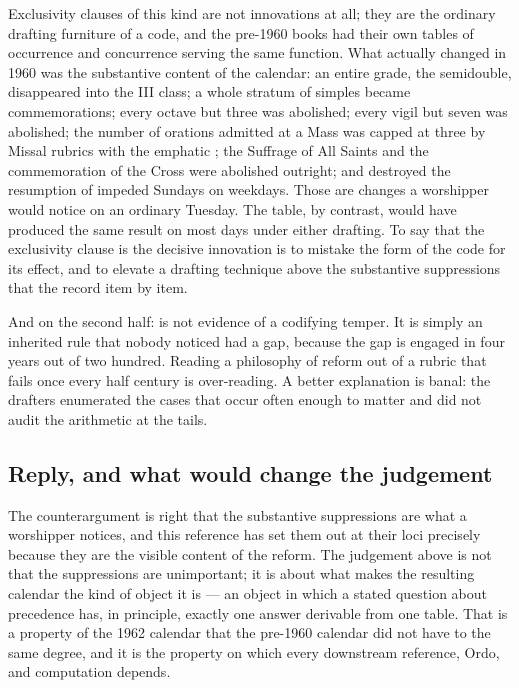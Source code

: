 Exclusivity clauses of this kind are not innovations at all; they are the ordinary drafting
furniture of a code, and the pre-1960 books had their own tables of occurrence and concurrence
serving the same function. What actually changed in 1960 was the substantive content of the
calendar: an entire grade, the semidouble, disappeared into the III class; a whole stratum of
simples became commemorations; every octave but three was abolished; every vigil but seven was
abolished; the number of orations admitted at a Mass was capped at three by Missal rubrics
 with the emphatic ; the Suffrage of All Saints and the
commemoration of the Cross were abolished outright; and  destroyed the resumption of
impeded Sundays on weekdays. Those are changes a worshipper would notice on an ordinary Tuesday.
The table, by contrast, would have produced the same result on most days under either drafting.
To say that the exclusivity clause is the decisive innovation is to mistake the form of the code
for its effect, and to elevate a drafting technique above the substantive suppressions that the
 record item by item.

And on the second half:  is not evidence of a codifying temper. It is simply an
inherited rule that nobody noticed had a gap, because the gap is engaged in four years out of
two hundred. Reading a philosophy of reform out of a rubric that fails once every half century
is over-reading. A better explanation is banal: the drafters enumerated the cases that occur
often enough to matter and did not audit the arithmetic at the tails.

\subsection{Reply, and what would change the judgement}

The counterargument is right that the substantive suppressions are what a worshipper notices,
and this reference has set them out at their loci precisely because they are the visible content
of the reform. The judgement above is not that the suppressions are unimportant; it is about
what makes the resulting calendar the kind of object it is — an object in which a stated
question about precedence has, in principle, exactly one answer derivable from one table. That
is a property of the 1962 calendar that the pre-1960 calendar did not have to the same degree,
and it is the property on which every downstream reference, Ordo, and computation depends.

